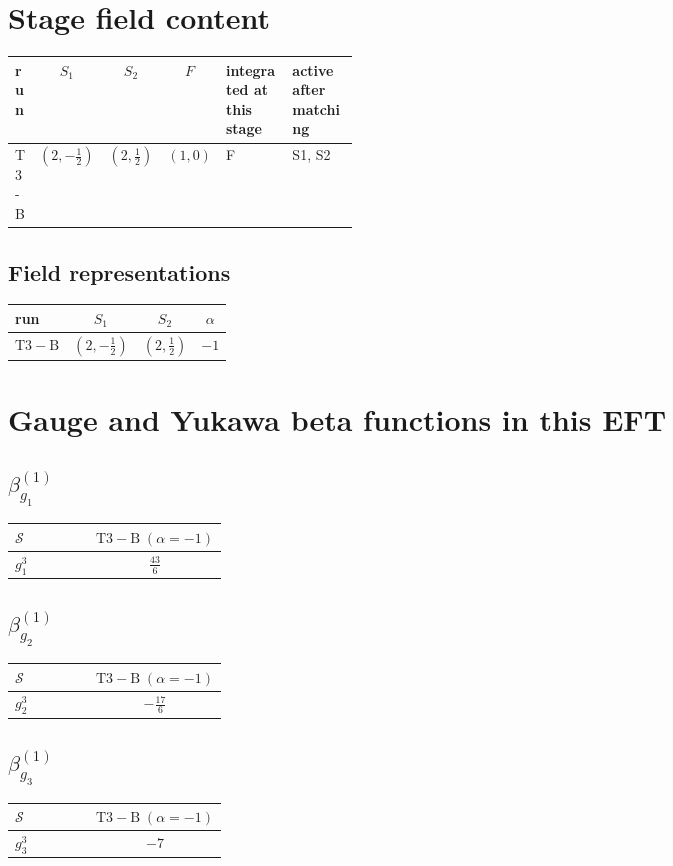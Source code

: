 \documentclass[9pt]{article}
\begin{document}
\section*{Stage field content}
\begin{longtable}{@{}lccc p{0.20\linewidth}p{0.20\linewidth}@{}}
\toprule
run & $S_1$ & $S_2$ & $F$ & integrated at this stage & active after matching \\
\midrule
T3-B & $(2,- \frac{1}{2})$ & $(2,\frac{1}{2})$ & $(1,0)$ & F & S1, S2 \\
\bottomrule
\end{longtable}
\subsection*{Field representations}
\begin{longtable}{@{}lccc@{}}
\toprule
run & $S_1$ & $S_2$ & $\alpha$ \\
\midrule
$\mathrm{T3-B}$ & $(2,- \frac{1}{2})$ & $(2,\frac{1}{2})$ & $-1$ \\
\bottomrule
\end{longtable}
\section*{Gauge and Yukawa beta functions in this EFT}
\subsection*{$ \beta_{g_1}^{(1)} $}
\begin{longtable}{@{}p{0.38\linewidth}c@{}}
\toprule
$\mathcal{S}$ & $ \mathrm{T3-B}\;(\alpha=-1) $ \\
\midrule
$ g_1^3 $ & $ \frac{43}{6} $ \\
\bottomrule
\end{longtable}
\subsection*{$ \beta_{g_2}^{(1)} $}
\begin{longtable}{@{}p{0.38\linewidth}c@{}}
\toprule
$\mathcal{S}$ & $ \mathrm{T3-B}\;(\alpha=-1) $ \\
\midrule
$ g_2^3 $ & $ - \frac{17}{6} $ \\
\bottomrule
\end{longtable}
\subsection*{$ \beta_{g_3}^{(1)} $}
\begin{longtable}{@{}p{0.38\linewidth}c@{}}
\toprule
$\mathcal{S}$ & $ \mathrm{T3-B}\;(\alpha=-1) $ \\
\midrule
$ g_3^3 $ & $ -7 $ \\
\bottomrule
\end{longtable}
\end{document}
